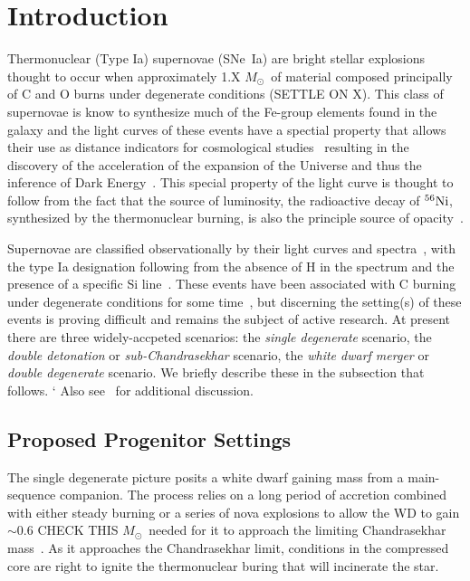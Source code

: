 \documentclass[iop,apj]{emulateapj}
\newcommand{\SNeIa}{SNe~Ia}
\newcommand{\Ni}[1]{\ensuremath{{}^{#1}{\rm Ni}}}
\newcommand{\Msun}{\ensuremath{M_\odot}}
\begin{document}
\section{Introduction}
\label{sec:intro}
Thermonuclear (Type Ia) supernovae (\SNeIa) are bright stellar explosions 
thought to occur when approximately 1.X \Msun\ of material composed principally 
of C and O burns under degenerate conditions (SETTLE ON X). This class of supernovae is
know to synthesize much of the Fe-group elements found in the galaxy and
the light curves of these events have a spectial property that allows
their use as distance indicators for cosmological studies~\citep{phillips:absolute}
resulting in the discovery of the acceleration of the expansion of
the Universe and thus the inference of Dark 
Energy~\citep{riess.filippenko.ea:observational,
perlmutter.aldering.ea:measurements,leibundgut2001}. 
This special property of the light curve is thought to follow
from the fact that the source of luminosity, the radioactive decay
of \Ni{56}, synthesized by the thermonuclear burning, is also the
principle source of opacity~\citep{Pinto2001The-type-Ia-sup}. 

Supernovae are classified observationally 
by their light curves and spectra~\citep{minkowski41,bertola64,porterfilippenko87,
wheelerharkness1990conf,Fili97}, with the type Ia designation following from
the absence of H in the spectrum and the presence of a specific Si 
line~\citep{filippenko:optical,hillebrandt.niemeyer:type}. These events
have been associated with C burning under degenerate conditions
for some time~\citep{hoylefowler60,arnett.truran.ea:nucleosynthesis},
but discerning the setting(s) of these events is proving difficult
and remains the subject of active research. At present there are three
widely-accpeted scenarios: the {\em single degenerate} scenario,
the {\em double detonation} or {\em sub-Chandrasekhar} scenario, 
the {\em white dwarf merger} or {\em double degenerate} scenario.
We briefly describe these in the subsection that follows. `
Also see~\citet{hillebrandt.niemeyer:type,howell2011,hillebrandtetal2013,calderetal2013,roepkesim2018}
for additional discussion.

\subsection{Proposed Progenitor Settings}

The single degenerate picture posits a white dwarf gaining mass
from a main-sequence companion. The process relies on a long
period of accretion combined with either steady burning or a 
series of nova explosions to allow the WD to gain
$\sim 0.6$ CHECK THIS \Msun\ needed for it to approach the
limiting Chandrasekhar mass~\citep{starrfieldetal2012}. As it approaches
the Chandrasekhar limit, conditions in the compressed core are right
to ignite the thermonuclear buring that will incinerate the star. 
\end{document}
